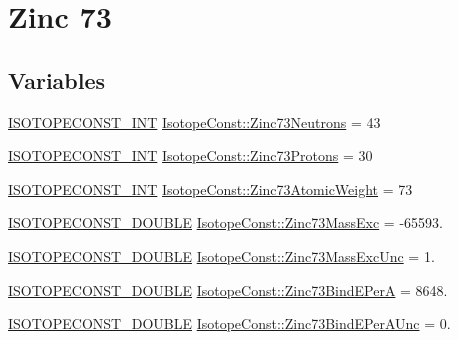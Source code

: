 \hypertarget{group___isotope_const-_zinc-_zn73}{}\section{Zinc 73}
\label{group___isotope_const-_zinc-_zn73}
\subsection*{Variables}
\begin{DoxyCompactItemize}
\item 
\mbox{\hyperlink{group___isotope_const-_macros_ga5f18360b3e99483a35c32d789e62621c}{I\+S\+O\+T\+O\+P\+E\+C\+O\+N\+S\+T\+\_\+\+I\+NT}} \mbox{\hyperlink{group___isotope_const-_zinc-_zn73_ga40c19a2184e8f7ccfed123770fbc6f65}{Isotope\+Const\+::\+Zinc73\+Neutrons}} = 43
\item 
\mbox{\hyperlink{group___isotope_const-_macros_ga5f18360b3e99483a35c32d789e62621c}{I\+S\+O\+T\+O\+P\+E\+C\+O\+N\+S\+T\+\_\+\+I\+NT}} \mbox{\hyperlink{group___isotope_const-_zinc-_zn73_ga1650168ad9c3cfe68f32c99d9f058318}{Isotope\+Const\+::\+Zinc73\+Protons}} = 30
\item 
\mbox{\hyperlink{group___isotope_const-_macros_ga5f18360b3e99483a35c32d789e62621c}{I\+S\+O\+T\+O\+P\+E\+C\+O\+N\+S\+T\+\_\+\+I\+NT}} \mbox{\hyperlink{group___isotope_const-_zinc-_zn73_ga3930cb7a77d77183984bbaf35e021967}{Isotope\+Const\+::\+Zinc73\+Atomic\+Weight}} = 73
\item 
\mbox{\hyperlink{group___isotope_const-_macros_ga8f45a7272ce02c0b4c65c44636ed719a}{I\+S\+O\+T\+O\+P\+E\+C\+O\+N\+S\+T\+\_\+\+D\+O\+U\+B\+LE}} \mbox{\hyperlink{group___isotope_const-_zinc-_zn73_ga88e513bb5403c2ff74b7962804520400}{Isotope\+Const\+::\+Zinc73\+Mass\+Exc}} = -\/65593.
\item 
\mbox{\hyperlink{group___isotope_const-_macros_ga8f45a7272ce02c0b4c65c44636ed719a}{I\+S\+O\+T\+O\+P\+E\+C\+O\+N\+S\+T\+\_\+\+D\+O\+U\+B\+LE}} \mbox{\hyperlink{group___isotope_const-_zinc-_zn73_ga4d1dd83a1b0891d51dab64e8f43c98e3}{Isotope\+Const\+::\+Zinc73\+Mass\+Exc\+Unc}} = 1.
\item 
\mbox{\hyperlink{group___isotope_const-_macros_ga8f45a7272ce02c0b4c65c44636ed719a}{I\+S\+O\+T\+O\+P\+E\+C\+O\+N\+S\+T\+\_\+\+D\+O\+U\+B\+LE}} \mbox{\hyperlink{group___isotope_const-_zinc-_zn73_ga625dca42f772263807ff940e43ab5f51}{Isotope\+Const\+::\+Zinc73\+Bind\+E\+PerA}} = 8648.
\item 
\mbox{\hyperlink{group___isotope_const-_macros_ga8f45a7272ce02c0b4c65c44636ed719a}{I\+S\+O\+T\+O\+P\+E\+C\+O\+N\+S\+T\+\_\+\+D\+O\+U\+B\+LE}} \mbox{\hyperlink{group___isotope_const-_zinc-_zn73_ga5de0623071c074001f0fa78fe17a3877}{Isotope\+Const\+::\+Zinc73\+Bind\+E\+Per\+A\+Unc}} = 0.

\end{DoxyCompactItemize}
